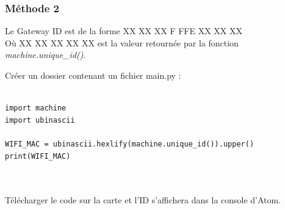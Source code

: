 \documentclass{article}
\begin{document}
 
 \subsubsection{Méthode 2}
Le Gateway ID est de la forme XX XX XX F FFE XX XX XX \\
Où XX XX XX XX XX est la valeur retournée par la fonction \textit{machine.unique\_id()}.\\

Créer un dossier contenant un fichier main.py :
\begin{verbatim}

import machine
import ubinascii

WIFI_MAC = ubinascii.hexlify(machine.unique_id()).upper()
print(WIFI_MAC)



\end{verbatim}

Télécharger le code sur la carte et l'ID s'affichera dans la console d'Atom.\\
\end{document}
